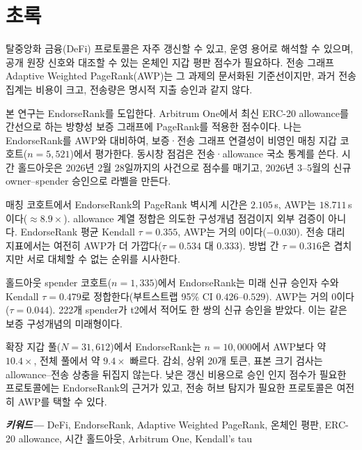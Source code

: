 
\chapter*{초록}

\label{ch:abstract}

탈중앙화 금융(DeFi) 프로토콜은 자주 갱신할 수 있고, 운영 용어로 해석할 수 있으며, 공개 원장 신호와 대조할 수 있는 온체인 지갑 평판 점수가 필요하다. 전송 그래프 Adaptive Weighted PageRank(AWP)는 그 과제의 문서화된 기준선이지만, 과거 전송 집계는 비용이 크고, 전송량은 명시적 지출 승인과 같지 않다.

본 연구는 EndorseRank를 도입한다. Arbitrum One에서 최신 ERC-20 allowance를 간선으로 하는 방향성 보증 그래프에 PageRank를 적용한 점수이다. 나는 EndorseRank를 AWP와 대비하여, 보증·전송 그래프 연결성이 비영인 매칭 지갑 코호트($n=5{,}521$)에서 평가한다. 동시창 점검은 전송·allowance 국소 통계를 쓴다. 시간 홀드아웃은 2026년 2월 28일까지의 사건으로 점수를 매기고, 2026년 3--5월의 신규 owner--spender 승인으로 라벨을 만든다.

매칭 코호트에서 EndorseRank의 PageRank 벽시계 시간은 $2.105$\,s, AWP는 $18.711$\,s이다($\approx 8.9\times$). allowance 계열 정합은 의도한 구성개념 점검이지 외부 검증이 아니다. EndorseRank 평균 Kendall $\tau=0.355$, AWP는 거의 0이다($-0.030$). 전송 대리 지표에서는 여전히 AWP가 더 가깝다($\tau=0.534$ 대 $0.333$). 방법 간 $\tau=0.316$은 겹치지만 서로 대체할 수 없는 순위를 시사한다.

홀드아웃 spender 코호트($n=1{,}335$)에서 EndorseRank는 미래 신규 승인자 수와 Kendall $\tau=0.479$로 정합한다(부트스트랩 95\% CI $0.426$--$0.529$). AWP는 거의 0이다($\tau=0.044$). 222개 spender가 t2에서 적어도 한 쌍의 신규 승인을 받았다. 이는 같은 보증 구성개념의 미래형이다.

확장 지갑 풀($N=31{,}612$)에서 EndorseRank는 $n=10{,}000$에서 AWP보다 약 $10.4\times$, 전체 풀에서 약 $9.4\times$ 빠르다. 감쇠, 상위 20개 토큰, 표본 크기 검사는 allowance--전송 상충을 뒤집지 않는다. 낮은 갱신 비용으로 승인 인지 점수가 필요한 프로토콜에는 EndorseRank의 근거가 있고, 전송 허브 탐지가 필요한 프로토콜은 여전히 AWP를 택할 수 있다.

\textbf{\emph{키워드---}} DeFi, EndorseRank, Adaptive Weighted PageRank, 온체인 평판, ERC-20 allowance, 시간 홀드아웃, Arbitrum One, Kendall's tau
